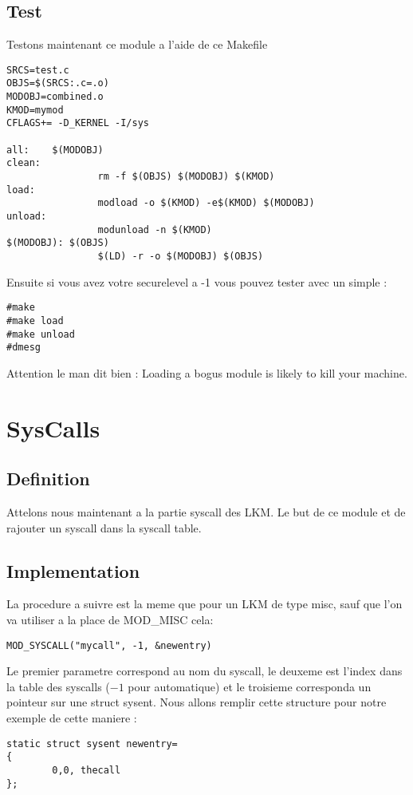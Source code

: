 \documentclass[a4paper, 11pt]{article}
\begin{document}
\subsection{Test}
Testons maintenant ce module a l'aide de ce Makefile
\begin{lstlisting}
SRCS=test.c
OBJS=$(SRCS:.c=.o)
MODOBJ=combined.o
KMOD=mymod
CFLAGS+= -D_KERNEL -I/sys

all:    $(MODOBJ)
clean:
                rm -f $(OBJS) $(MODOBJ) $(KMOD)
load:
                modload -o $(KMOD) -e$(KMOD) $(MODOBJ)
unload:
                modunload -n $(KMOD)
$(MODOBJ): $(OBJS)
                $(LD) -r -o $(MODOBJ) $(OBJS)
\end{lstlisting}
\par Ensuite si vous avez votre securelevel a -1 vous pouvez tester
avec un simple :
\begin{lstlisting}
#make
#make load
#make unload
#dmesg
\end{lstlisting}
\par Attention le man dit bien : Loading a bogus module is likely to kill your
machine.

\newpage
\section{SysCalls}
\subsection{Definition}
Attelons nous maintenant a la partie syscall des LKM. Le but de ce module et de rajouter
 un syscall dans la syscall table. 

\subsection{Implementation}
La procedure a suivre est la meme que pour un LKM de type misc, sauf que l'on va
 utiliser a la place de
MOD\_MISC cela:
\begin{lstlisting}
MOD_SYSCALL("mycall", -1, &newentry)
\end{lstlisting}
\par Le premier parametre correspond au nom du syscall, le deuxeme est l'index dans
la table des syscalls ($-1$ pour automatique) et le troisieme corresponda un
pointeur sur une struct sysent. Nous allons remplir cette structure pour notre
exemple de cette maniere :
\begin{lstlisting}
static struct sysent newentry=
{
        0,0, thecall
};
\end{lstlisting}
\end{document}
